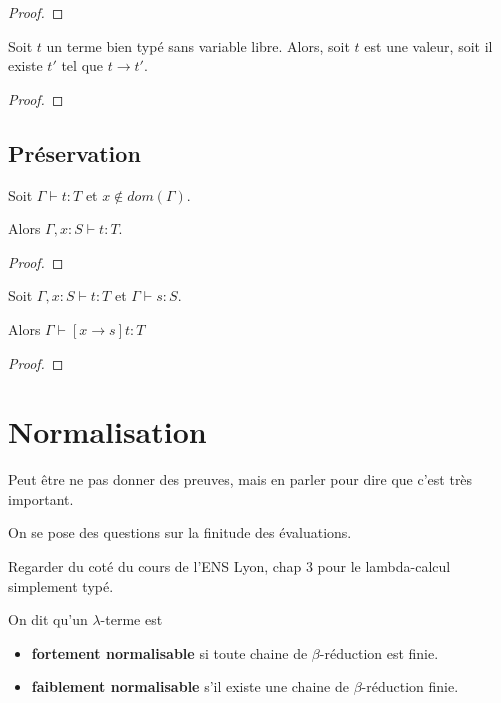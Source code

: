 \begin{proof}
  
\end{proof}

\begin{theorem} 
  Soit $t$ un terme bien typé sans variable libre. Alors, soit $t$ est une
  valeur, soit il existe $t'$ tel que $t \rightarrow t'$.
\end{theorem}

\begin{proof}
  
\end{proof}

\subsection*{Préservation}

\begin{lemma} [d'affaiblissement]
  Soit $\Gamma \vdash t : T$ et $x \notin dom(\Gamma)$.

  Alors $\Gamma, x : S \vdash t : T$.
\end{lemma}

\begin{proof}
  
\end{proof}

\begin{lemma} 
  Soit $\Gamma, x : S \vdash t : T$ et $\Gamma \vdash s : S$.

  Alors $\Gamma \vdash [x \rightarrow s] t : T$
\end{lemma}

\begin{proof}

\end{proof}

\section*{Normalisation}

Peut être ne pas donner des preuves, mais en parler pour dire que c'est très important.

On se pose des questions sur la finitude des évaluations.

Regarder du coté du cours de l'ENS Lyon, chap 3 pour le lambda-calcul simplement typé.

\begin{definition}
  On dit qu'un $\lambda$-terme est
  \begin{itemize}
  \item \textbf{fortement normalisable} si
  toute chaine de $\beta$-réduction est finie.
  \item \textbf{faiblement normalisable} s'il existe une chaine de
    $\beta$-réduction finie.
  \end{itemize}
\end{definition}

